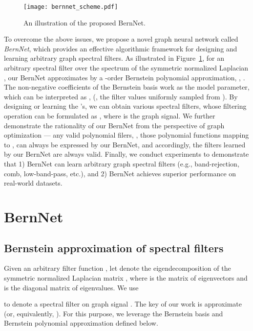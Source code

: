 \documentclass{article}
\begin{document}
\begin{figure}
    \centering
    \texttt{[image: bernnet\_scheme.pdf]}
    \vspace{-3mm}
    \caption{An illustration of the proposed BernNet.}
    \label{fig:scheme}
\end{figure}

To overcome the above issues, we propose a novel graph neural network called \textit{BernNet}, which provides an effective algorithmic framework for designing and learning arbitrary graph spectral filters.
As illustrated in Figure~\ref{fig:scheme}, for an arbitrary spectral filter  over the spectrum of the symmetric normalized Laplacian , our BernNet approximates  by a -order Bernstein polynomial approximation, , . 
The non-negative coefficients  of the Bernstein basis  work as the model parameter, which can be interpreted as ,  (, the filter values uniformly sampled from ). 
By designing or learning the 's, we can obtain various spectral filters, whose filtering operation can be formulated as , where  is the graph signal. 
We further demonstrate the rationality of our BernNet from the perspective of graph optimization --- any valid polynomial filers, , those polynomial functions mapping  to , can always be expressed by our BernNet, and accordingly, the filters learned by our BernNet are always valid.
Finally, we conduct experiments to demonstrate that 1) BernNet can learn arbitrary graph spectral filters (e.g., band-rejection, comb, low-band-pass, etc.), and 2) BernNet achieves superior performance on real-world datasets.




 
 






\section{BernNet}
\subsection{Bernstein approximation of spectral filters}
\label{ber:filter}
Given an arbitrary filter function  , let  denote the eigendecomposition of the  symmetric normalized Laplacian matrix , where  is the matrix of eigenvectors and  is the diagonal matrix of eigenvalues. We use 

to denote a spectral filter on graph signal . 
The key of our work is approximate  (or, equivalently, ).
For this purpose, we leverage the Bernstein basis and Bernstein polynomial approximation defined below. 
\end{document}
